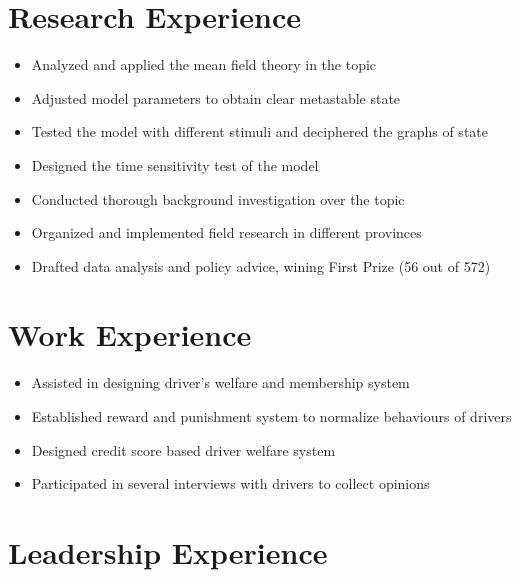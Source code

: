 \documentclass{resume}
\begin{document}
\section{Research Experience}
\begin{itemize}
  \item Analyzed and applied the mean field theory in the topic
  \item Adjusted model parameters to obtain clear metastable state
  \item Tested the model with different stimuli and deciphered the graphs of state 
  \item Designed the time sensitivity test of the model 
\end{itemize}
\begin{itemize}
  \item Conducted thorough background investigation over the topic
  \item Organized and implemented field research in different provinces
  \item Drafted data analysis and policy advice, wining First Prize (56 out of 572) 
\end{itemize}

\section{Work Experience}
\begin{itemize}
  \item Assisted in designing driver's welfare and membership system
  \item Established reward and punishment system to normalize behaviours of drivers
  \item Designed credit score based driver welfare system 
  \item Participated in several interviews with drivers to collect opinions 
\end{itemize}
\section{Leadership Experience}
\end{document}
